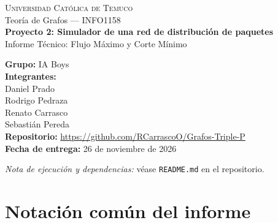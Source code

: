 \documentclass[12pt, a4paper]{article}
\begin{document}
\begin{titlepage}
  \centering
  \vspace*{2cm}
  {\Large \textsc{Universidad Católica de Temuco}}\\[0.4cm]
  {\large Teoría de Grafos --- INFO1158}\\[2.2cm]

  {\huge \textbf{Proyecto 2: Simulador de una red de distribución de paquetes}}\\[0.6cm]
  {\large Informe Técnico: Flujo Máximo y Corte Mínimo}\\[2.5cm]

  \begin{flushleft}
    \hspace{2.2cm}\textbf{Grupo:} IA Boys\\[0.4cm]
    \hspace{2.2cm}\textbf{Integrantes:}\\
    \hspace{2.8cm}Daniel Prado\\
    \hspace{2.8cm}Rodrigo Pedraza\\
    \hspace{2.8cm}Renato Carrasco\\
    \hspace{2.8cm}Sebastián Pereda\\[1cm]
    \hspace{2.2cm}\textbf{Repositorio:} \url{https://github.com/RCarrascoO/Grafos-Triple-P}\\
    \hspace{2.2cm}\textbf{Fecha de entrega:} 26 de noviembre de 2026
  \end{flushleft}

  \vfill
  {\small \textit{Nota de ejecución y dependencias:} véase \texttt{README.md} en el repositorio.}
\end{titlepage}

\tableofcontents
\newpage

\section*{Notación común del informe}
\end{document}
